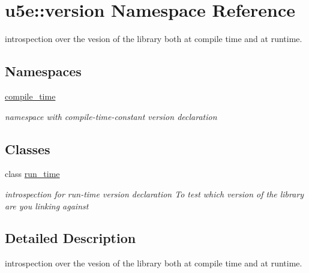 \hypertarget{namespaceu5e_1_1version}{}\section{u5e\+:\+:version Namespace Reference}
\label{namespaceu5e_1_1version}


introspection over the vesion of the library both at compile time and at runtime.  


\subsection*{Namespaces}
\begin{DoxyCompactItemize}
\item 
 \hyperlink{namespaceu5e_1_1version_1_1compile__time}{compile\+\_\+time}
\begin{DoxyCompactList}\small\item\em namespace with compile-\/time-\/constant version declaration \end{DoxyCompactList}\end{DoxyCompactItemize}
\subsection*{Classes}
\begin{DoxyCompactItemize}
\item 
class \hyperlink{classu5e_1_1version_1_1run__time}{run\+\_\+time}
\begin{DoxyCompactList}\small\item\em introspection for run-\/time version declaration To test which version of the library are you linking against \end{DoxyCompactList}\end{DoxyCompactItemize}


\subsection{Detailed Description}
introspection over the vesion of the library both at compile time and at runtime. 